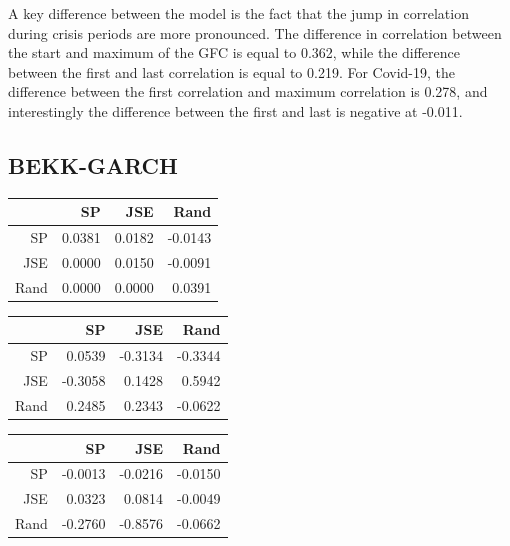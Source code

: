 \documentclass[11pt,preprint, authoryear]{elsarticle}
\let\origtable\table
\let\endorigtable\endtable
\renewenvironment{table}[1][2] {
    \expandafter\origtable\expandafter[H]
} {
    \endorigtable
}
\numberwithin{equation}{section}
\numberwithin{figure}{section}
\numberwithin{table}{section}
\begin{document}
A key difference between the model is the fact that the jump in
correlation during crisis periods are more pronounced. The difference in
correlation between the start and maximum of the GFC is equal to 0.362,
while the difference between the first and last correlation is equal to
0.219. For Covid-19, the difference between the first correlation and
maximum correlation is 0.278, and interestingly the difference between
the first and last is negative at -0.011.

\hypertarget{bekk-garch-1}{%
\subsection{BEKK-GARCH}\label{bekk-garch-1}}

\begin{table}[H]
\centering
\caption{BEKK-GARCH Constants \label{tab10}} 
\begin{tabular}{rrrr}
  \hline
 & SP & JSE & Rand \\ 
  \hline
SP & 0.0381 & 0.0182 & -0.0143 \\ 
  JSE & 0.0000 & 0.0150 & -0.0091 \\ 
  Rand & 0.0000 & 0.0000 & 0.0391 \\ 
   \hline
\end{tabular}
\end{table}
\begin{table}[H]
\centering
\caption{BEKK-GARCH ARCH estimates \label{tab11}} 
\begin{tabular}{rrrr}
  \hline
 & SP & JSE & Rand \\ 
  \hline
SP & 0.0539 & -0.3134 & -0.3344 \\ 
  JSE & -0.3058 & 0.1428 & 0.5942 \\ 
  Rand & 0.2485 & 0.2343 & -0.0622 \\ 
   \hline
\end{tabular}
\end{table}
\begin{table}[H]
\centering
\caption{BEKK-GARCH GARCH estimates \label{tab12}} 
\begin{tabular}{rrrr}
  \hline
 & SP & JSE & Rand \\ 
  \hline
SP & -0.0013 & -0.0216 & -0.0150 \\ 
  JSE & 0.0323 & 0.0814 & -0.0049 \\ 
  Rand & -0.2760 & -0.8576 & -0.0662 \\ 
   \hline
\end{tabular}
\end{table}
\end{document}
